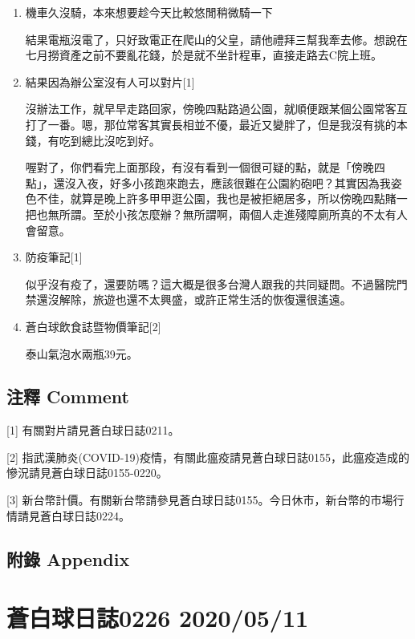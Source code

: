 \documentclass[a5paper, 11pt
]{book}
\begin{document}
\begin{enumerate}
\def\labelenumi{\arabic{enumi}.}
\item
  機車久沒騎，本來想要趁今天比較悠閒稍微騎一下

  結果電瓶沒電了，只好致電正在爬山的父皇，請他禮拜三幫我牽去修。想說在七月撈資產之前不要亂花錢，於是就不坐計程車，直接走路去C院上班。
\item
  結果因為辦公室沒有人可以對片{[}1{]}

  沒辦法工作，就早早走路回家，傍晚四點路過公園，就順便跟某個公園常客互打了一番。嗯，那位常客其實長相並不優，最近又變胖了，但是我沒有挑的本錢，有吃到總比沒吃到好。

  喔對了，你們看完上面那段，有沒有看到一個很可疑的點，就是「傍晚四點」，還沒入夜，好多小孩跑來跑去，應該很難在公園約砲吧？其實因為我姿色不佳，就算是晚上許多甲甲逛公園，我也是被拒絕居多，所以傍晚四點賭一把也無所謂。至於小孩怎麼辦？無所謂啊，兩個人走進殘障廁所真的不太有人會留意。
\item
  防疫筆記{[}1{]}

  似乎沒有疫了，還要防嗎？這大概是很多台灣人跟我的共同疑問。不過醫院門禁還沒解除，旅遊也還不太興盛，或許正常生活的恢復還很遙遠。
\item
  蒼白球飲食誌暨物價筆記{[}2{]}

  泰山氣泡水兩瓶39元。
\end{enumerate}

\hypertarget{ux6ce8ux91cb-comment-70}{%
\subsection{注釋 Comment}\label{ux6ce8ux91cb-comment-70}}

{[}1{]} 有關對片請見蒼白球日誌0211。

{[}2{]}
指武漢肺炎(COVID-19)疫情，有關此瘟疫請見蒼白球日誌0155，此瘟疫造成的慘況請見蒼白球日誌0155-0220。

{[}3{]}
新台幣計價。有關新台幣請參見蒼白球日誌0155。今日休市，新台幣的市場行情請見蒼白球日誌0224。

\hypertarget{ux9644ux9304-appendix-70}{%
\subsection{附錄 Appendix}\label{ux9644ux9304-appendix-70}}

\hypertarget{ux84bcux767dux7403ux65e5ux8a8c0226-20200511}{%
\section{蒼白球日誌0226
2020/05/11}\label{ux84bcux767dux7403ux65e5ux8a8c0226-20200511}}
\end{document}
